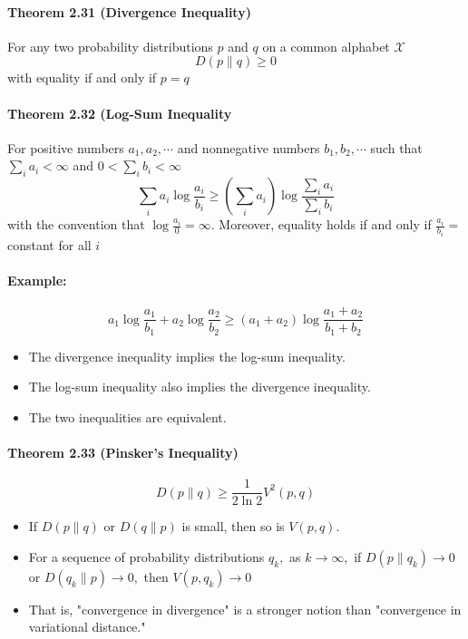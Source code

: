 \documentclass[8pt]{article}
\begin{document}
\paragraph{Theorem 2.31 (Divergence Inequality)} For any two probability distributions $p$ and $q$ on a common alphabet $\mathcal{X}$
$$
D(p \| q) \geq 0
$$
with equality if and only if $p=q$

\paragraph{Theorem 2.32 (Log-Sum Inequality} For positive numbers $a_{1}, a_{2}, \cdots$ and nonnegative numbers $b_{1}, b_{2}, \cdots$ such that $\sum_{i} a_{i}<\infty$ and $0<\sum_{i} b_{i}<\infty$
$$
\sum_{i} a_{i} \log \frac{a_{i}}{b_{i}} \geq\left(\sum_{i} a_{i}\right) \log \frac{\sum_{i} a_{i}}{\sum_{i} b_{i}}
$$
with the convention that $\log \frac{a_{i}}{0}=\infty$. Moreover, equality holds if and only if $\frac{a_{i}}{b_{i}}=$ constant for all $i$
\paragraph{Example:}
$$
a_{1} \log \frac{a_{1}}{b_{1}}+a_{2} \log \frac{a_{2}}{b_{2}} \geq\left(a_{1}+a_{2}\right) \log \frac{a_{1}+a_{2}}{b_{1}+b_{2}}
$$
\begin{itemize}
	\item The divergence inequality implies the log-sum inequality.
	\item The log-sum inequality also implies the divergence inequality.
	\item The two inequalities are equivalent.
\end{itemize}

\paragraph{Theorem 2.33 (Pinsker's Inequality)}
$$
D(p \| q) \geq \frac{1}{2 \ln 2} V^{2}(p, q)
$$
\begin{itemize}
	\item  If $D(p \| q)$ or $D(q \| p)$ is small, then so is $V(p, q)$.
	\item For a sequence of probability distributions $q_{k},$ as $k \rightarrow \infty,$ if $D\left(p \| q_{k}\right) \rightarrow 0$ or $D\left(q_{k} \| p\right) \rightarrow 0,$ then $V\left(p, q_{k}\right) \rightarrow 0$
	\item That is, "convergence in divergence" is a stronger notion than "convergence in variational distance."
\end{itemize}
\end{document}

